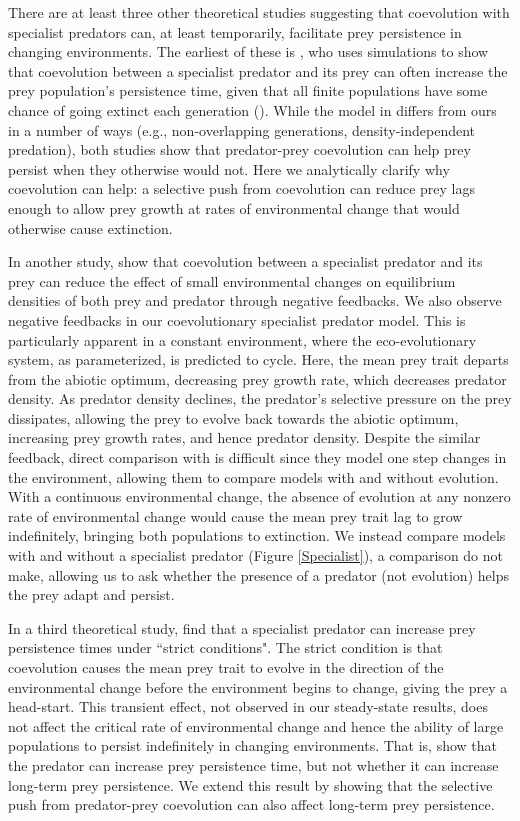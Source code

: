 \documentclass[11pt]{article}
\begin{document}
There are at least three other theoretical studies suggesting that coevolution with specialist predators can, at least temporarily, facilitate prey persistence in changing environments.
The earliest of these is \cite{Jones2008}, who uses simulations to show that coevolution between a specialist predator and its prey can often increase the prey population's persistence time, given that all finite populations have some chance of going extinct each generation (\citealt{Burger1995}).
While the model in \cite{Jones2008} differs from ours in a number of ways (e.g., non-overlapping generations, density-independent predation), both studies show that predator-prey coevolution can help prey persist when they otherwise would not.
Here we analytically clarify why coevolution can help: a selective push from coevolution can reduce prey lags enough to allow prey growth at rates of environmental change that would otherwise cause extinction.  

In another study, \cite{Northfield2013} show that coevolution between a specialist predator and its prey can reduce the effect of small environmental changes on equilibrium densities of both prey and predator through negative feedbacks.
We also observe negative feedbacks in our coevolutionary specialist predator model.
This is particularly apparent in a constant environment, where the eco-evolutionary system, as parameterized, is predicted to cycle.
Here, the mean prey trait departs from the abiotic optimum, decreasing prey growth rate, which decreases predator density.
As predator density declines, the predator's selective pressure on the prey dissipates, allowing the prey to evolve back towards the abiotic optimum, increasing prey growth rates, and hence predator density.
Despite the similar feedback, direct comparison with \cite{Northfield2013} is difficult since they model one step changes in the environment, allowing them to compare models with and without evolution.
With a continuous environmental change, the absence of evolution at any nonzero rate of environmental change would cause the mean prey trait lag to grow indefinitely, bringing both populations to extinction.
We instead compare models with and without a specialist predator (Figure \ref{Specialist}), a comparison \cite{Northfield2013} do not make, allowing us to ask whether the presence of a predator (not evolution) helps the prey adapt and persist.

In a third theoretical study, \cite{Mellard2015} find that a specialist predator can increase prey persistence times under ``strict conditions".
The strict condition is that coevolution causes the mean prey trait to evolve in the direction of the environmental change before the environment begins to change, giving the prey a head-start.
This transient effect, not observed in our steady-state results, does not affect the critical rate of environmental change and hence the ability of large populations to persist indefinitely in changing environments.
That is, \cite{Mellard2015} show that the predator can increase prey persistence time, but not whether it can increase long-term prey persistence.
We extend this result by showing that the selective push from predator-prey coevolution can also affect long-term prey persistence. 
\end{document}
